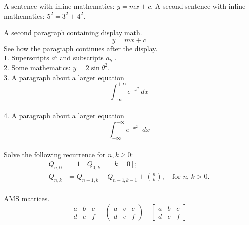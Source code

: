 \documentclass{article}
\newcommand{\diff}{\mathop{}\!d}            %
\begin{document}

A sentence with inline mathematics: $y = mx + c$.
A second sentence with inline mathematics: $5^{2}=3^{2}+4^{2}$.


A second paragraph containing display math.
\[
  y = mx + c
\]
See how the paragraph continues after the display. \\

1. Superscripts $a^{b}$ and subscripts $a_{b}$ .		\\

2. Some mathematics: $y = 2 \sin \theta^{2}$.  \\


3. A paragraph about a larger equation
\[
\int_{-\infty}^{+\infty} e^{-x^2} \, dx
\]		\\



4. A paragraph about a larger equation
\[
\int_{-\infty}^{+\infty} e^{-x^2} \diff x
\]		\\


Solve the following recurrence for $ n,k\geq 0 $:
\begin{align*}
  Q_{n,0} &= 1   \quad Q_{0,k} = [k=0];  \\
  Q_{n,k} &= Q_{n-1,k}+Q_{n-1,k-1}+\binom{n}{k}, \quad\text{for $n$, $k>0$.}
\end{align*}		\\



AMS matrices.
\[
\begin{matrix}
a & b & c \\
d & e & f
\end{matrix}
\quad
\begin{pmatrix}
a & b & c \\
d & e & f
\end{pmatrix}
\quad
\begin{bmatrix}
a & b & c \\
d & e & f
\end{bmatrix}
\]			\\
\end{document}
